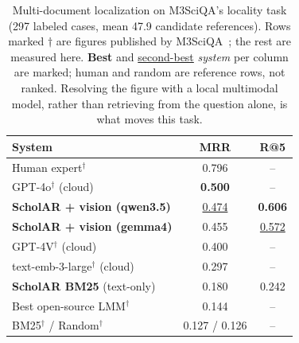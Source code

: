 \documentclass[11pt,letterpaper]{article}
\newcommand{\best}[1]{\textbf{#1}}
\newcommand{\snd}[1]{\underline{#1}}
\begin{document}
\begin{table}[t]
  \centering
  \caption{Multi-document localization on M3SciQA's locality task (297 labeled cases, mean
           47.9 candidate references). Rows marked $\dagger$ are figures published by
           M3SciQA~\citep{li2024m3sciqa}; the rest are measured here. \best{Best} and
           \snd{second-best} \emph{system} per column are marked; human and random are reference
           rows, not ranked. Resolving the figure with a local multimodal model, rather than
           retrieving from the question alone, is what moves this task.}
  \label{tab:multidoc}
  \setlength{\tabcolsep}{2pt}
  \begin{tabular}{lcc}
    \toprule
    \textbf{System} & \textbf{MRR} & \textbf{R@5} \\
    \midrule
    Human expert$^\dagger$                    & 0.796 & -- \\
    GPT-4o$^\dagger$ (cloud)                  & \best{0.500} & -- \\
    \textbf{ScholAR + vision (qwen3.5)}       & \snd{0.474} & \best{0.606} \\
    \textbf{ScholAR + vision (gemma4)}        & 0.455 & \snd{0.572} \\
    GPT-4V$^\dagger$ (cloud)                  & 0.400 & -- \\
    text-emb-3-large$^\dagger$ (cloud)        & 0.297 & -- \\
    \textbf{ScholAR BM25} (text-only)         & 0.180 & 0.242 \\
    Best open-source LMM$^\dagger$            & 0.144 & -- \\
    BM25$^\dagger$ / Random$^\dagger$         & 0.127 / 0.126 & -- \\
    \bottomrule
  \end{tabular}
\end{table}
\end{document}
